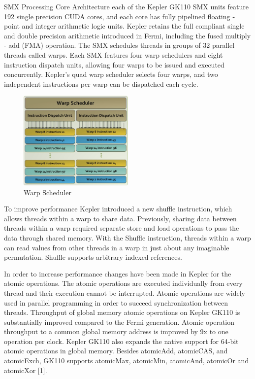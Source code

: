 SMX Processing Core Architecture each of the Kepler GK110 SMX units feature 192 single precision CUDA cores, and each core has fully pipelined floating ‐ point and integer arithmetic logic units. Kepler retains the full compliant single and double precision arithmetic introduced in Fermi, including the fused multiply - add (FMA) operation.
The SMX schedules threads in groups of 32 parallel threads called warps. Each SMX features four warp schedulers and eight instruction dispatch units, allowing four warps to be issued and executed concurrently. Kepler’s quad warp scheduler selects four warps, and two independent instructions per warp can be dispatched each cycle.

\begin{figure}[H]
   \centering
       \includegraphics[width=0.5\textwidth]{warp_scheduler}
   \caption{Warp Scheduler}
   \label{fig:warp scheduler}
\end{figure}

To improve performance Kepler introduced a new shuffle instruction, which allows threads within a warp to share data. Previously, sharing data between threads within a warp required separate store and load operations to pass the data through shared memory. With the Shuffle instruction, threads within a warp can read values from other threads in a warp in just about any imaginable permutation. Shuffle supports arbitrary indexed references.
 
In order to increase performance changes have been made in Kepler for the atomic operations. The atomic operations are executed individually from every thread and their execution cannot be interrupted. Atomic operations are widely used in parallel programming in order to succeed synchronization between threads. Throughput of global memory atomic operations on Kepler GK110 is substantially improved compared to the Fermi generation. Atomic operation throughput to a common global memory address is improved by 9x to one operation per clock. Kepler GK110 also expands the native support for 64‐bit atomic operations in global memory. Besides atomicAdd, atomicCAS, and atomicExch, GK110 supports atomicMax, atomicMin, atomicAnd, atomicOr and atomicXor [1].

